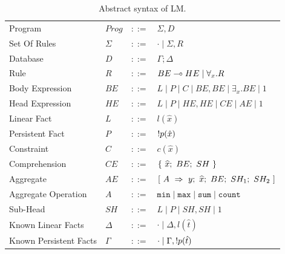 \renewcommand{\arraystretch}{1.2}
\begin{table}[h]
\centering
\begin{tabular}{ l l c l }
  Program & $Prog$ & $::=$ & $\Sigma, D$ \\
  Set Of Rules & $\Sigma$ & $::=$ & $\cdot \; | \; \Sigma, R$\\
  Database & $D$ & $::=$ & $\Gamma; \Delta$ \\
  Rule & $R$ & $::=$ & $BE \multimap HE \; | \; \forall_{x}. R$ \\
  Body Expression & $BE$ & $::=$ & $L \; | \; P \; | \; C \; | \; BE, BE \; | \; \exists_{x}. BE \; | \; 1$\\
  Head Expression & $HE$ & $::=$ & $L \; | \; P \; | \; HE, HE \; | \; CE \; | \; AE \; | \; 1$\\
  
  Linear Fact & $L$ & $::=$ & $l(\hat{x})$\\
  Persistent Fact & $P$ & $::=$ & ${!} p(\hat{x})$\\
  Constraint & $C$ & $::=$ & $c(\hat{x})$ \\
  
  Comprehension & $CE$ & $::=$ & $\{~\widehat{x};~BE;~SH~\}$ \\
  Aggregate & $AE$ & $::=$ & $[~A~\Rightarrow~y;~\widehat{x};~BE;~SH_1;~SH_2~]$ \\
  Aggregate Operation & $A$ & $::=$ & $\mathtt{min} \; | \; \mathtt{max} \; | \; \mathtt{sum} \; | \; \mathtt{count}$ \\
  
  Sub-Head & $SH$ & $::=$ & $L \; | \; P \; | \; SH, SH \; | \; 1$\\
  
  Known Linear Facts & $\Delta$ & $::=$ & $\cdot \; | \; \Delta, l(\hat{t})$ \\
  Known Persistent Facts & $\Gamma$ & $::=$ & $\cdot \; | \; \Gamma, {!} p(\hat{t})$ \\
\end{tabular}
\vspace{0.5\intextsep}
\caption{Abstract syntax of LM.}
\label{tbl:ast}
\vspace{-1\intextsep}
\end{table}
\renewcommand{\arraystretch}{1.0}

